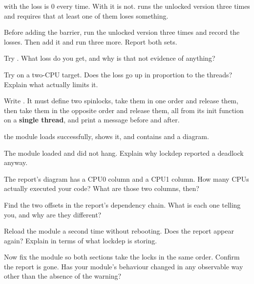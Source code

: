 \checkyourself with  the loss is 0 every time. With  it is not.
 runs the unlocked version three times and requires that at least one of them
loses something.

 Before adding the barrier, run the unlocked version three times and record the losses.
Then add it and run three more. Report both sets.

 Try . What loss do you get, and why is that not evidence of anything?

 Try  on a two-CPU target. Does the loss go up in proportion to the
threads? Explain what actually limits it.

\label{c7:ex:7}

Write . It must define two spinlocks, take them in one order and
release them, then take them in the opposite order and release them, all from its init function on a
\textbf{single thread}, and print a message before and after.

\checkyourself the module loads successfully,  shows it, and  contains
 and a  diagram.

 The module loaded and did not hang. Explain why lockdep reported a deadlock anyway.

 The report's diagram has a CPU0 column and a CPU1 column. How many CPUs actually executed
your code? What are those two columns, then?

 Find the two  offsets in the report's dependency chain. What is
each one telling you, and why are they different?

 Reload the module a second time without rebooting. Does the report appear again? Explain
in terms of what lockdep is storing.

 Now fix the module so both sections take the locks in the same order. Confirm the report
is gone. Has your module's behaviour changed in any observable way other than the absence of the
warning?

\label{c7:ex:8}

